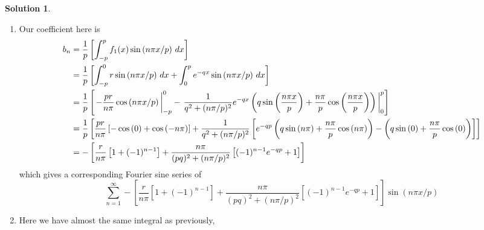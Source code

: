 \documentclass[10pt]{article}
\theoremstyle{definition}
\newtheorem{soln}{Solution}
\begin{document}
\begin{soln}
  \begin{enumerate}[label=(\alph*)]
    \item Our coefficient here is
          \begin{align*}
            b_n & = \frac{1}{p}\left[\int_{-p}^{p}f_1(x)\sin\left(n\pi x/p\right)\,dx\right]                                                                              \\
                & = \frac{1}{p}\left[\int_{-p}^{0}r\sin\left(n\pi x/p\right)\,dx
            +\int_{0}^{p}e^{-qx}\sin\left(n\pi x/p\right)\,dx\right]                                                                                                      \\
                & = \frac{1}{p}\left[\eval{-\frac{pr}{n\pi}\cos\left(n\pi x/p\right)}_{-p}^{0}
            -\eval{\frac{1}{q^{2} + (n\pi/p)^2}e^{-qx} \left(q \sin\left(\frac{n\pi x}{p}\right) + \frac{n\pi}{p}\cos\left(\frac{n\pi x}{p}\right)\right)}_{0}^{p}\right] \\
                & = \frac{1}{p}\left[
              \frac{pr}{n\pi}\left[-\cos\left(0\right)
                +\cos\left(-n\pi\right)\right]
              +
              \frac{1}{q^{2} + (n\pi/p)^2}\left[
                e^{-qp} \left(q \sin\left(n\pi\right) + \frac{n\pi}{p}\cos\left(n\pi\right)\right)
                -\left(q \sin\left(0\right) + \frac{n\pi}{p}\cos\left(0\right)\right)
            \right]\right]                                                                                                                                                \\
                & = -\left[
            \frac{r}{n\pi}\left[1
              +(-1)^{n-1}\right]
            +
            \frac{n\pi}{(pq)^2 + (n\pi/p)^2}\left[
            (-1)^{n-1}e^{-qp}+1
            \right]\right]                                                                                                                                                \\
          \end{align*}
          which gives a corresponding Fourier sine series of
          $$\sum_{n=1}^{\infty}-\left[
            \frac{r}{n\pi}\left[1
              +(-1)^{n-1}\right]
            +
            \frac{n\pi}{(pq)^2 + (n\pi/p)^2}\left[
            (-1)^{n-1}e^{-qp}+1
            \right]\right]\sin \left(n\pi x/p\right)$$
    \item Here we have almost the same integral as previously,
          \begin{align*}

\end{align*}
\end{enumerate}
\end{soln}
\end{document}
